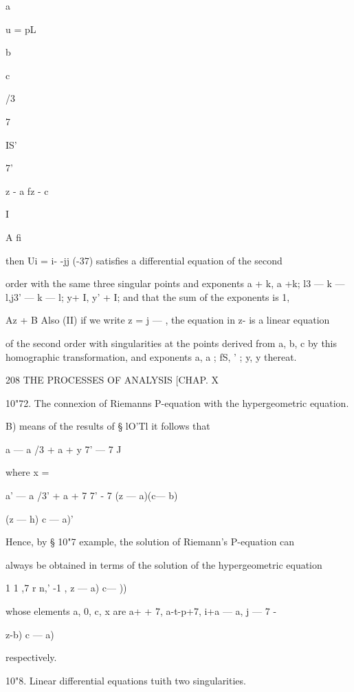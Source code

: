 a

u = pL


b


c




/3


7




IS'


7'


z - a\* fz - c\


I




A fi



then Ui = i- -jj (-37) satisfies a differential equation of the second

order with the same three singular points and exponents a + k, a +k;
l3 — k — l,j3' — k — l; y+ I, y' + I; and that the sum of the
exponents is 1,

Az + B Also (II) if we write z = j — , the equation in z- is a linear
equation

of the second order with singularities at the points derived from a,
b, c by this homographic transformation, and exponents a, a ; fS, ' ;
y, y thereat.



208 THE PROCESSES OF ANALYSIS [CHAP. X

10"72. The connexion of Riemanns P-equation with the hypergeometric
equation.

B) means of the results of § lO'Tl it follows that

 a — a /3 + a + y 7' — 7 J




where x =



a' — a /3' + a + 7 7' - 7 (z — a)(c— b)



(z — h) c — a)'

Hence, by § 10"7 example, the solution of Riemann's P-equation can

always be obtained in terms of the solution of the hypergeometric
equation

1 1 ,7 r n,' -1 , z — a) c— ))

whose elements a, 0, c, x are a+ + 7, a-t-p+7, i+a — a, j — 7 -

 z-b) c — a)

respectively.

10"8. Linear differential equations tuith two singularities.

